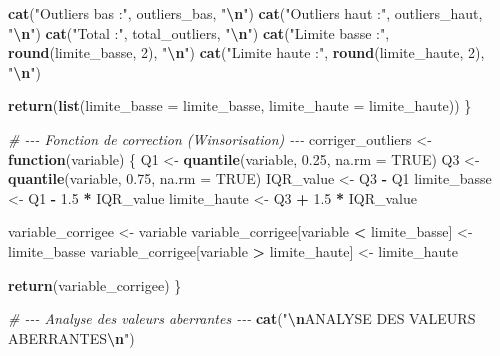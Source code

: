\documentclass[
]{article}
\newenvironment{Shaded}{\begin{snugshade}}{\end{snugshade}}
\newcommand{\AttributeTok}[1]{\textcolor[rgb]{0.13,0.29,0.53}{#1}}
\newcommand{\CommentTok}[1]{\textcolor[rgb]{0.56,0.35,0.01}{\textit{#1}}}
\newcommand{\ConstantTok}[1]{\textcolor[rgb]{0.56,0.35,0.01}{#1}}
\newcommand{\ControlFlowTok}[1]{\textcolor[rgb]{0.13,0.29,0.53}{\textbf{#1}}}
\newcommand{\DecValTok}[1]{\textcolor[rgb]{0.00,0.00,0.81}{#1}}
\newcommand{\FloatTok}[1]{\textcolor[rgb]{0.00,0.00,0.81}{#1}}
\newcommand{\FunctionTok}[1]{\textcolor[rgb]{0.13,0.29,0.53}{\textbf{#1}}}
\newcommand{\NormalTok}[1]{#1}
\newcommand{\OtherTok}[1]{\textcolor[rgb]{0.56,0.35,0.01}{#1}}
\newcommand{\SpecialCharTok}[1]{\textcolor[rgb]{0.81,0.36,0.00}{\textbf{#1}}}
\newcommand{\StringTok}[1]{\textcolor[rgb]{0.31,0.60,0.02}{#1}}
\begin{document}
\begin{Shaded}
\begin{Highlighting}[]
  \FunctionTok{cat}\NormalTok{(}\StringTok{"Outliers bas  :"}\NormalTok{, outliers\_bas,  }\StringTok{"}\SpecialCharTok{\textbackslash{}n}\StringTok{"}\NormalTok{)}
  \FunctionTok{cat}\NormalTok{(}\StringTok{"Outliers haut :"}\NormalTok{, outliers\_haut, }\StringTok{"}\SpecialCharTok{\textbackslash{}n}\StringTok{"}\NormalTok{)}
  \FunctionTok{cat}\NormalTok{(}\StringTok{"Total         :"}\NormalTok{, total\_outliers, }\StringTok{"}\SpecialCharTok{\textbackslash{}n}\StringTok{"}\NormalTok{)}
  \FunctionTok{cat}\NormalTok{(}\StringTok{"Limite basse  :"}\NormalTok{, }\FunctionTok{round}\NormalTok{(limite\_basse, }\DecValTok{2}\NormalTok{), }\StringTok{"}\SpecialCharTok{\textbackslash{}n}\StringTok{"}\NormalTok{)}
  \FunctionTok{cat}\NormalTok{(}\StringTok{"Limite haute  :"}\NormalTok{, }\FunctionTok{round}\NormalTok{(limite\_haute, }\DecValTok{2}\NormalTok{), }\StringTok{"}\SpecialCharTok{\textbackslash{}n}\StringTok{"}\NormalTok{)}

  \FunctionTok{return}\NormalTok{(}\FunctionTok{list}\NormalTok{(}\AttributeTok{limite\_basse =}\NormalTok{ limite\_basse, }\AttributeTok{limite\_haute =}\NormalTok{ limite\_haute))}
\NormalTok{\}}

\CommentTok{\# {-}{-}{-} Fonction de correction (Winsorisation) {-}{-}{-}}
\NormalTok{corriger\_outliers }\OtherTok{\textless{}{-}} \ControlFlowTok{function}\NormalTok{(variable) \{}
\NormalTok{  Q1 }\OtherTok{\textless{}{-}} \FunctionTok{quantile}\NormalTok{(variable, }\FloatTok{0.25}\NormalTok{, }\AttributeTok{na.rm =} \ConstantTok{TRUE}\NormalTok{)}
\NormalTok{  Q3 }\OtherTok{\textless{}{-}} \FunctionTok{quantile}\NormalTok{(variable, }\FloatTok{0.75}\NormalTok{, }\AttributeTok{na.rm =} \ConstantTok{TRUE}\NormalTok{)}
\NormalTok{  IQR\_value }\OtherTok{\textless{}{-}}\NormalTok{ Q3 }\SpecialCharTok{{-}}\NormalTok{ Q1}
\NormalTok{  limite\_basse }\OtherTok{\textless{}{-}}\NormalTok{ Q1 }\SpecialCharTok{{-}} \FloatTok{1.5} \SpecialCharTok{*}\NormalTok{ IQR\_value}
\NormalTok{  limite\_haute }\OtherTok{\textless{}{-}}\NormalTok{ Q3 }\SpecialCharTok{+} \FloatTok{1.5} \SpecialCharTok{*}\NormalTok{ IQR\_value}

\NormalTok{  variable\_corrigee }\OtherTok{\textless{}{-}}\NormalTok{ variable}
\NormalTok{  variable\_corrigee[variable }\SpecialCharTok{\textless{}}\NormalTok{ limite\_basse] }\OtherTok{\textless{}{-}}\NormalTok{ limite\_basse}
\NormalTok{  variable\_corrigee[variable }\SpecialCharTok{\textgreater{}}\NormalTok{ limite\_haute] }\OtherTok{\textless{}{-}}\NormalTok{ limite\_haute}

  \FunctionTok{return}\NormalTok{(variable\_corrigee)}
\NormalTok{\}}

\CommentTok{\# {-}{-}{-} Analyse des valeurs aberrantes {-}{-}{-}}
\FunctionTok{cat}\NormalTok{(}\StringTok{"}\SpecialCharTok{\textbackslash{}n}\StringTok{ANALYSE DES VALEURS ABERRANTES}\SpecialCharTok{\textbackslash{}n}\StringTok{"}\NormalTok{)}
\end{Highlighting}
\end{Shaded}
\end{document}
